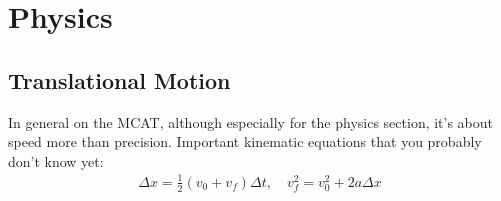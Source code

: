 \documentclass{article}
\theoremstyle{plain}%
\theoremstyle{definition}
\theoremstyle{remark}
\begin{document}
\section{Physics}
\subsection{Translational Motion}
In general on the MCAT, although especially for the physics section, it's about speed more than precision. Important kinematic equations that you probably don't know yet:
\begin{equation}
\begin{split}
\Delta x = \frac{1}{2}\left(v_0+v_f\right)\Delta t, \quad v_f^2=v_0^2+2a\Delta x
\end{split}
\end{equation}
\end{document}
